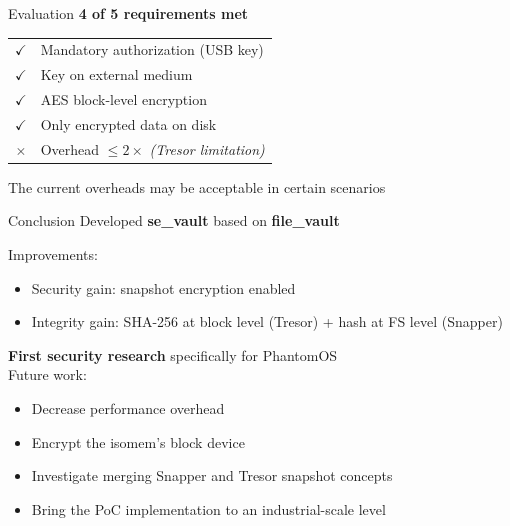 \documentclass{beamer}
\begin{document}

\begin{frame}{Evaluation}
    \textbf{4 of 5 requirements met}
    \begin{tabular}{cl}
        $\checkmark$ & Mandatory authorization (USB key) \\
        $\checkmark$ & Key on external medium \\
        $\checkmark$ & AES block-level encryption \\
        $\checkmark$ & Only encrypted data on disk \\
        $\times$     & Overhead $\leq 2\times$ \textit{(Tresor limitation)} \\
    \end{tabular}

    \bigskip

    The current overheads may be acceptable in certain scenarios
\end{frame}


\begin{frame}{Conclusion}
    Developed \textbf{se\_vault} based on \textbf{file\_vault}

    Improvements:
    \begin{itemize}
        \item Security gain: snapshot encryption enabled
        \item Integrity gain: SHA-256 at block level (Tresor) + hash at FS level (Snapper)
    \end{itemize}

    \bigskip
    \textbf{First security research} specifically for PhantomOS\\

    \bigskip
    Future work:
    \begin{itemize}
        \item Decrease performance overhead
        \item Encrypt the isomem's block device
        \item Investigate merging Snapper and Tresor snapshot concepts
        \item Bring the PoC implementation to an industrial-scale level
    \end{itemize}
\end{frame}

\end{document}
